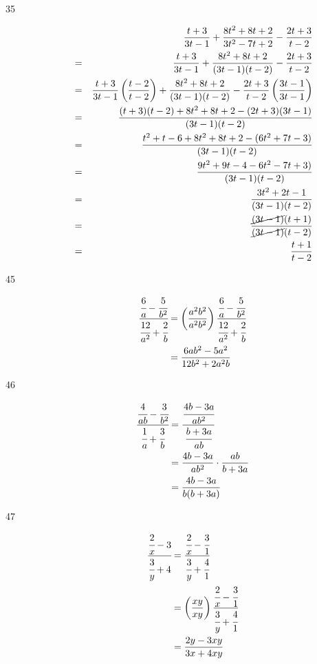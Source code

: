 \documentclass[fleqn,addpoints]{exam}
\begin{document}
\begin{description}
\item[35]
\begin{eqnarray*}
  &&  \frac{t+3}{3t-1} + \frac{8t^2+8t+2}{3t^2-7t+2} - \frac{2t+3}{t-2} \\
  &=& \frac{t+3}{3t-1} + \frac{8t^2+8t+2}{(3t-1)(t-2)} - \frac{2t+3}{t-2} \\
  &=& \frac{t+3}{3t-1} \left( \frac{t-2}{t-2} \right)  + \frac{8t^2+8t+2}{(3t-1)(t-2)}
             - \frac{2t+3}{t-2} \left( \frac{3t-1}{3t-1} \right) \\
  &=& \frac{(t+3)(t-2) + 8t^2+8t+2 - (2t+3)(3t-1)}{(3t-1)(t-2)} \\
  &=& \frac{t^2+t-6 + 8t^2+8t+2 - (6t^2+7t-3)}{(3t-1)(t-2)} \\
  &=& \frac{9t^2+9t-4 - 6t^2-7t+3)}{(3t-1)(t-2)} \\
  &=& \frac{3t^2+2t-1}{(3t-1)(t-2)} \\
  &=& \frac{\cancel{(3t-1)}(t+1)}{\cancel{(3t-1)}(t-2)} \\
  &=& \frac{t+1}{t-2} \\
\end{eqnarray*}

\item[45]
\begin{align*}
  \cfrac{ \cfrac{6}{a} - \cfrac{5}{b^2} } { \cfrac{12}{a^2} + \cfrac{2}{b} } &= 
       \left( \frac{a^2b^2}{a^2b^2} \right) \cfrac{ \cfrac{6}{a} - \cfrac{5}{b^2} } { \cfrac{12}{a^2} + \cfrac{2}{b} } \\
  &= \frac{6ab^2 - 5a^2}{12b^2 + 2a^2b}
\end{align*}

\item[46]
\begin{align*}
  \cfrac{ \cfrac{4}{ab} - \cfrac{3}{b^2} } { \cfrac{1}{a} + \cfrac{3}{b} } &=
      \cfrac{ \cfrac{4b-3a}{ab^2} } { \cfrac{b+3a}{ab} } \\
  &= \frac{4b-3a}{ab^2} \cdot \frac{ab}{b+3a} \\
  &= \frac{4b-3a}{b(b+3a)} \\
\end{align*}

\item[47]
\begin{align*}
  \cfrac{ \cfrac{2}{x} - 3}{\cfrac{3}{y} + 4} &= \cfrac{ \cfrac{2}{x} - \cfrac{3}{1}}{\cfrac{3}{y} + \cfrac{4}{1}} \\
  &= \left( \frac{xy}{xy} \right) \cfrac{ \cfrac{2}{x} - \cfrac{3}{1}}{\cfrac{3}{y} + \cfrac{4}{1}} \\
  &= \frac{2y-3xy}{3x+4xy} \\
\end{align*}


\end{description}
\end{document}

